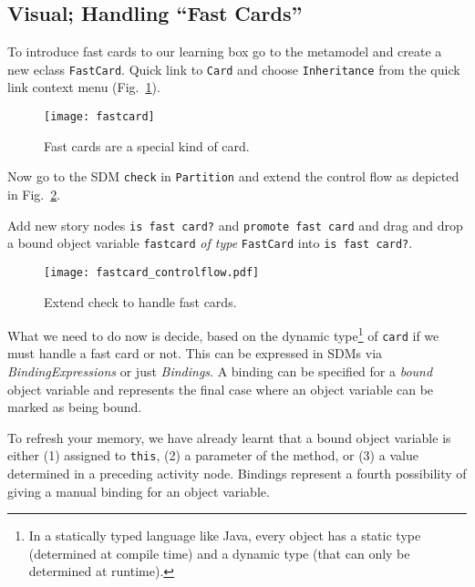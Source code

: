 \newpage
\subsection{Visual; Handling ``Fast Cards''}
\visHeader
\hypertarget{fastCard vis}{}

To introduce fast cards to our learning box go to the metamodel and create a new eclass \texttt{FastCard}. Quick link to \texttt{Card} and choose
\texttt{Inheritance} from the quick link context menu (Fig.~\ref{fig:sdm_fastcard_1}).

\begin{figure}[htp]
\begin{center}
  \texttt{[image: fastcard]}
  \caption{Fast cards are a special kind of card.}  
  \label{fig:sdm_fastcard_1}
\end{center}
\end{figure}

Now go to the SDM \texttt{check} in \texttt{Partition} and extend the control flow as depicted in Fig.~\ref{fig:sdm_fastcard_2}.
 
Add new story nodes \texttt{is fast card?} and \texttt{promote fast card} and drag and drop a bound object variable \texttt{fastcard} \emph{of type}
\texttt{FastCard} into \texttt{is fast card?}.

\begin{figure}[htbp]
\begin{center}
  \texttt{[image: fastcard\_controlflow.pdf]}
  \caption{Extend check to handle fast cards.}  
  \label{fig:sdm_fastcard_2}
\end{center}
\end{figure}

What we need to do now is decide, based on the dynamic type\footnote{In a statically typed language like Java, every object has a static type (determined at
compile time) and a dynamic type (that can only be determined at runtime).} of \texttt{card} if we must handle a fast card or not. This can be expressed in SDMs
via \emph{BindingExpressions} or just \emph{Bindings}. A binding can be specified for a \emph{bound} object variable  and represents the final
case where an object variable can be marked as being bound.

To refresh your memory, we have already learnt that a bound object variable is either (1) assigned to \texttt{this}, (2) a parameter of the method, or (3) a
value determined in a preceding activity node. Bindings represent a fourth possibility of giving a manual binding for an object variable.


